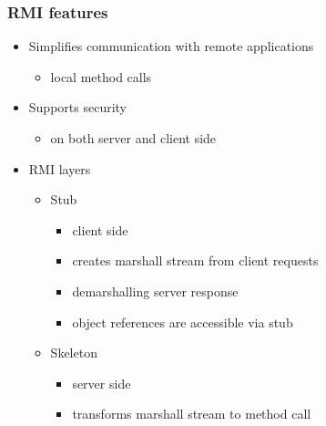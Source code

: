\documentclass[10pt,xcolor=pdflatex]{beamer}
\begin{document}
\begin{frame}[containsverbatim]\frametitle{RMI features}
\begin{itemize}
	\item Simplifies communication with remote applications
	  \begin{itemize}
		\item local method calls
	  \end{itemize}
    \item Supports security
	  \begin{itemize}
		\item on both server and client side
	  \end{itemize}
	\item RMI layers
      \begin{itemize}
    	\item Stub
          \begin{itemize}
            \item client side
            \item creates marshall stream from client requests
            \item demarshalling server response
            \item object references are accessible via stub
          \end{itemize}
        \item Skeleton 
          \begin{itemize}
            \item server side
            \item transforms marshall stream to method call
          \end{itemize}
      \end{itemize}
\end{itemize}
\end{frame}
\end{document}
